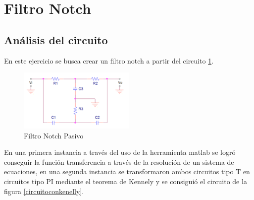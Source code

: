 



%
\section{Filtro Notch}
\subsection{Análisis del circuito}
En este ejercicio se busca crear un filtro notch a partir del circuito \ref{fig:circuito_1}. 

\begin{figure}[H]                                                       
    \centering
    	\includegraphics[width=0.5\textwidth]{resources/circuito_1.png}
    	\caption{Filtro Notch Pasivo}
    	\label{fig:circuito_1}
\end{figure}

En una primera instancia a través del uso de la herramienta matlab se logró conseguir la función transferencia a través de la resolución de un sistema de ecuaciones, en una segunda instancia se transformaron ambos circuitos tipo T en circuitos tipo PI mediante el teorema de Kennely y se consiguió el circuito de la figura \ref{circuitoconkenelly}.

